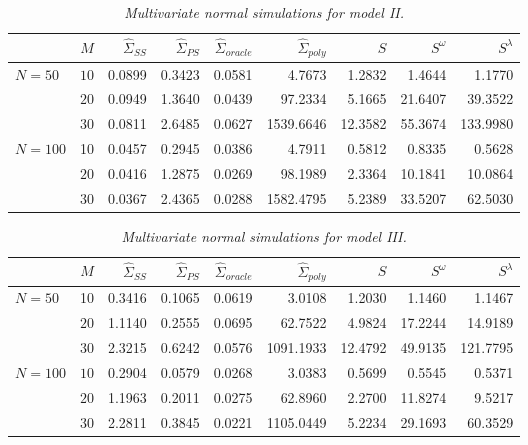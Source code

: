 \begin{table}[H]
\centering
\caption{\textit{Multivariate normal simulations for model II.}}
\begin{tabular}{lrrrrrrrr}
 & $M$ &$\hat{\Sigma}_{SS}$& $\hat{\Sigma}_{PS}$ &$\hat{\Sigma}_{oracle}$& $\hat{\Sigma}_{poly}$ & $S$ &$S^\omega$& $S^\lambda$ \\ 
  \hline
   $N = 50$ & $10$ & 0.0899 & 0.3423 & 0.0581 & 4.7673 & 1.2832 & 1.4644 & 1.1770 \\ 
   & $20$ & 0.0949 & 1.3640 & 0.0439 & 97.2334 & 5.1665 & 21.6407 & 39.3522 \\ 
     & $30$ & 0.0811 & 2.6485 & 0.0627 & 1539.6646 & 12.3582 & 55.3674 & 133.9980 \\ 
  $N = 100$ & 10 & 0.0457 & 0.2945 & 0.0386 & 4.7911 & 0.5812 & 0.8335 & 0.5628 \\ 
    & $20$ & 0.0416 & 1.2875 & 0.0269 & 98.1989 & 2.3364 & 10.1841 & 10.0864 \\ 
    & $30$ & 0.0367 & 2.4365 & 0.0288 & 1582.4795 & 5.2389 & 33.5207 & 62.5030 \\ 
   \hline
\end{tabular}
\label{table:simulation-1-entropy-loss-sigma-2}
\end{table}
%
%
\begin{table}[H]
\centering
\caption{\textit{Multivariate normal simulations for model III.} }
\begin{tabular}{lrrrrrrrr}
 & $M$ &$\hat{\Sigma}_{SS}$& $\hat{\Sigma}_{PS}$ &$\hat{\Sigma}_{oracle}$& $\hat{\Sigma}_{poly}$ & $S$ &$S^\omega$& $S^\lambda$ \\ 
   \hline
 $N = 50$ & 10 & 0.3416 & 0.1065 & 0.0619 & 3.0108 & 1.2030 & 1.1460 & 1.1467 \\ 
      & $20$ & 1.1140 & 0.2555 & 0.0695 & 62.7522 & 4.9824 & 17.2244 & 14.9189 \\ 
    & $30$ & 2.3215 & 0.6242 & 0.0576 & 1091.1933 & 12.4792 & 49.9135 & 121.7795 \\ 
     $N = 100$ & $10$ & 0.2904 & 0.0579 & 0.0268 & 3.0383 & 0.5699 & 0.5545 & 0.5371 \\ 
     & $20$ & 1.1963 & 0.2011 & 0.0275 & 62.8960 & 2.2700 & 11.8274 & 9.5217 \\ 
    & $30$ & 2.2811 & 0.3845 & 0.0221 & 1105.0449 & 5.2234 & 29.1693 & 60.3529 \\ 
   \hline
\end{tabular}
\label{table:simulation-1-entropy-loss-sigma-3}
\end{table}

